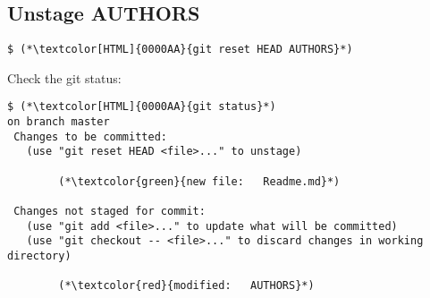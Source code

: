 \subsection{Unstage AUTHORS}
\begin{frame}[fragile]
  \subslidetitle

  \begin{lstlisting}
$ (*\textcolor[HTML]{0000AA}{git reset HEAD AUTHORS}*)
  \end{lstlisting}

  Check the git status:
  \begin{lstlisting}
$ (*\textcolor[HTML]{0000AA}{git status}*)
on branch master
 Changes to be committed:
   (use "git reset HEAD <file>..." to unstage)

        (*\textcolor{green}{new file:   Readme.md}*)

 Changes not staged for commit:
   (use "git add <file>..." to update what will be committed)
   (use "git checkout -- <file>..." to discard changes in working directory)

        (*\textcolor{red}{modified:   AUTHORS}*)

  \end{lstlisting}
\end{frame}
